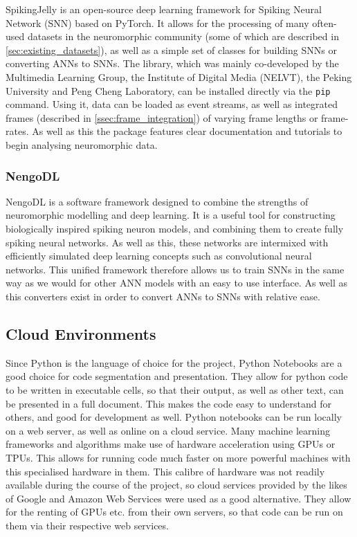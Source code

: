 SpikingJelly\cite{SpikingJelly} is an open-source deep learning framework for Spiking Neural Network (SNN) based on PyTorch. It allows for the processing of many often-used datasets in the neuromorphic community (some of which are described in \cref{sec:existing_datasets}), as well as a simple set of classes for building SNNs or converting ANNs to SNNs. The library, which was mainly co-developed by the Multimedia Learning Group, the Institute of Digital Media (NELVT), the Peking University and Peng Cheng Laboratory, can be installed directly via the \lstinline{pip} command. Using it, data can be loaded as event streams, as well as integrated frames (described in \cref{ssec:frame_integration}) of varying frame lengths or frame-rates. As well as this the package features clear documentation and tutorials to begin analysing neuromorphic data.

\subsubsection{NengoDL} \label{sssec:nengo}

NengoDL\cite{NengoDL} is a software framework designed to combine the strengths of neuromorphic modelling and deep learning. It is a useful tool for constructing biologically inspired spiking neuron models, and combining them to create fully spiking neural networks. As well as this, these networks are intermixed with efficiently simulated deep learning concepts such as convolutional neural networks. This unified framework therefore allows us to train SNNs in the same way as we would for other ANN models with an easy to use interface. As well as this converters exist in order to convert ANNs to SNNs with relative ease.

\subsection{Cloud Environments}

Since Python is the language of choice for the project, Python Notebooks are a good choice for code segmentation and presentation. They allow for python code to be written in executable cells, so that their output, as well as other text, can be presented in a full document. This makes the code easy to understand for others, and good for development as well. Python notebooks can be run locally on a web server, as well as online on a cloud service. Many machine learning frameworks and algorithms make use of hardware acceleration using GPUs or TPUs. This allows for running code much faster on more powerful machines with this specialised hardware in them. This calibre of hardware was not readily available during the course of the project, so cloud services provided by the likes of Google and Amazon Web Services were used as a good alternative. They allow for the renting of GPUs etc. from their own servers, so that code can be run on them via their respective web services. 

